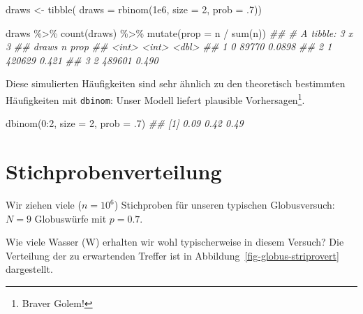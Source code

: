 \documentclass[
  a4paper,
  DIV=11]{scrreprt}
\newenvironment{Shaded}{\begin{snugshade}}{\end{snugshade}}
\newcommand{\AttributeTok}[1]{\textcolor[rgb]{0.40,0.45,0.13}{#1}}
\newcommand{\DecValTok}[1]{\textcolor[rgb]{0.68,0.00,0.00}{#1}}
\newcommand{\DocumentationTok}[1]{\textcolor[rgb]{0.37,0.37,0.37}{\textit{#1}}}
\newcommand{\FloatTok}[1]{\textcolor[rgb]{0.68,0.00,0.00}{#1}}
\newcommand{\FunctionTok}[1]{\textcolor[rgb]{0.28,0.35,0.67}{#1}}
\newcommand{\NormalTok}[1]{\textcolor[rgb]{0.00,0.23,0.31}{#1}}
\newcommand{\OtherTok}[1]{\textcolor[rgb]{0.00,0.23,0.31}{#1}}
\newcommand{\SpecialCharTok}[1]{\textcolor[rgb]{0.37,0.37,0.37}{#1}}
\theoremstyle{definition}
\theoremstyle{remark}
\begin{document}
\begin{Shaded}
\begin{Highlighting}[]
\NormalTok{draws }\OtherTok{\textless{}{-}} 
  \FunctionTok{tibble}\NormalTok{(}
    \AttributeTok{draws =} \FunctionTok{rbinom}\NormalTok{(}\FloatTok{1e6}\NormalTok{, }\AttributeTok{size =} \DecValTok{2}\NormalTok{, }\AttributeTok{prob =}\NormalTok{ .}\DecValTok{7}\NormalTok{))}

\NormalTok{draws }\SpecialCharTok{\%\textgreater{}\%} 
  \FunctionTok{count}\NormalTok{(draws) }\SpecialCharTok{\%\textgreater{}\%} 
  \FunctionTok{mutate}\NormalTok{(}\AttributeTok{prop =}\NormalTok{ n }\SpecialCharTok{/} \FunctionTok{sum}\NormalTok{(n))}
\DocumentationTok{\#\# \# A tibble: 3 x 3}
\DocumentationTok{\#\#   draws      n   prop}
\DocumentationTok{\#\#   \textless{}int\textgreater{}  \textless{}int\textgreater{}  \textless{}dbl\textgreater{}}
\DocumentationTok{\#\# 1     0  89770 0.0898}
\DocumentationTok{\#\# 2     1 420629 0.421 }
\DocumentationTok{\#\# 3     2 489601 0.490}
\end{Highlighting}
\end{Shaded}

Diese simulierten Häufigkeiten sind sehr ähnlich zu den theoretisch
bestimmten Häufigkeiten mit \texttt{dbinom}: Unser Modell liefert
plausible Vorhersagen\footnote{Braver Golem!}.

\begin{Shaded}
\begin{Highlighting}[]
\FunctionTok{dbinom}\NormalTok{(}\DecValTok{0}\SpecialCharTok{:}\DecValTok{2}\NormalTok{, }\AttributeTok{size =} \DecValTok{2}\NormalTok{, }\AttributeTok{prob =}\NormalTok{ .}\DecValTok{7}\NormalTok{)}
\DocumentationTok{\#\# [1] 0.09 0.42 0.49}
\end{Highlighting}
\end{Shaded}

\hypertarget{stichprobenverteilung}{%
\section{Stichprobenverteilung}\label{stichprobenverteilung}}

Wir ziehen viele (\(n=10^6\)) Stichproben für unseren typischen
Globusversuch: \(N=9\) Globuswürfe mit \(p=0.7\).

Wie viele Wasser (W) erhalten wir wohl typischerweise in diesem Versuch?
Die Verteilung der zu erwartenden Treffer ist in
Abbildung~\ref{fig-globus-striprovert} dargestellt.
\end{document}
